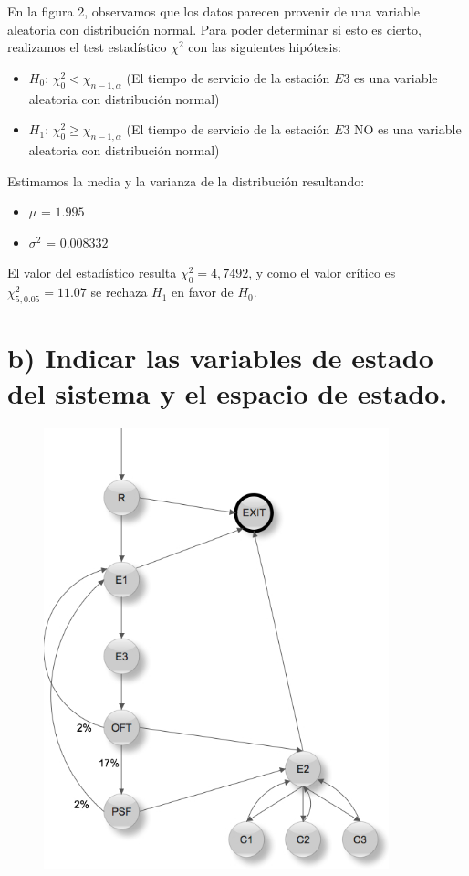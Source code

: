 \documentclass{article}
\numberwithin{equation}{section}
\numberwithin{figure}{section}
\numberwithin{table}{section}
\begin{document}
En la figura 2, observamos que los datos parecen provenir de una variable aleatoria con distribuci\'on normal.
Para poder determinar si esto es cierto, realizamos el test estad\'istico $\chi^2$ con las siguientes hip\'otesis:

\begin{itemize}
 \item {$H_{0}$:} $\chi_{0}^2 < \chi_{n-1,\alpha}$ (El tiempo de servicio de la estaci\'on $E3$ es una variable aleatoria con distribuci\'on normal)
 \item {$H_{1}$:} $\chi_{0}^2 \ge \chi_{n-1,\alpha}$ (El tiempo de servicio de la estaci\'on $E3$ NO es una variable aleatoria con distribuci\'on normal)
\end{itemize}

Estimamos la media y la varianza de la distribuci\'on resultando:
\begin{itemize}
 \item {$\mu$ =} $1.995$
 \item {$\sigma^2$ =}  $0.008332$
\end{itemize}

El valor del estad\'istico resulta $\chi_{0}^2 = 4,7492$, y como el valor
cr\'itico es $\chi_{5,0.05}^2 = 11.07$ se rechaza $H_1$ en favor de $H_0$.

\section*{b) Indicar las variables de estado del sistema y el espacio de estado.}

\begin{figure}
\begin{center}
\includegraphics[width=10cm]{automata.jpeg}
	\end{center}
\end{figure}
\end{document}
